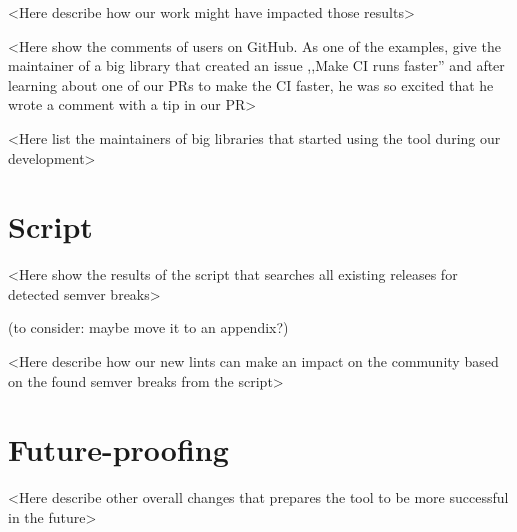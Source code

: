 \documentclass[licencjacka,en]{pracamgr}
\begin{document}
<Here describe how our work might have impacted those results>

<Here show the comments of users on GitHub.
As one of the examples, give the maintainer of a big
library that created an issue ,,Make CI runs faster''
and after learning about one of our PRs to make the CI faster,
he was so excited that he wrote a comment with a tip in our PR>

<Here list the maintainers of big libraries that started using the tool during our development>


\section{Script}

<Here show the results of the script that searches all existing releases for detected semver breaks>

(to consider: maybe move it to an appendix?)

<Here describe how our new lints can make an impact on the community based on the found semver breaks from the script>


\section{Future-proofing}

<Here describe other overall changes that prepares the tool to be more successful in the future>




\appendix
\end{document}
